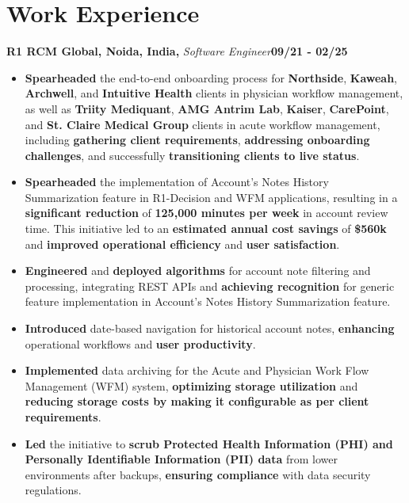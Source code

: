 \documentclass{article}
\newcommand{\subheading}[1]{\textbf{#1}}
\newenvironment{workexp}[3]{%
  \noindent\subheading{#1,} \textit{#2}\hfill\textbf{#3}\par%
}{\bigskip}
\begin{document}
\section*{Work Experience}
\begin{workexp}{R1 RCM Global, Noida, India}{Software Engineer}{09/21 - 02/25}
	\begin{itemize}[left=0pt, align=left]
        \item \textbf{Spearheaded} the end-to-end onboarding process for \textbf{Northside}, \textbf{Kaweah}, \textbf{Archwell}, and \textbf{Intuitive Health} clients in physician workflow management, as well as \textbf{Triity Mediquant}, \textbf{AMG Antrim Lab}, \textbf{Kaiser}, \textbf{CarePoint}, and \textbf{St. Claire Medical Group} clients in acute workflow management, including \textbf{gathering client requirements}, \textbf{addressing onboarding challenges}, and successfully \textbf{transitioning clients to live status}.
            
		\item \textbf{Spearheaded} the implementation of Account’s Notes
		      History Summarization feature in R1-Decision and WFM
		      applications, resulting in a \textbf{significant reduction} of
		      \textbf{125,000 minutes per week} in account review time. This
		      initiative led to an \textbf{estimated annual cost savings} of
		      \textbf{\$560k} and \textbf{improved operational efficiency} and
		      \textbf{user satisfaction}.
		          
		\item \textbf{Engineered} and \textbf{deployed algorithms} for account
		      note filtering and processing, integrating REST APIs and
		      \textbf{achieving recognition} for generic feature
		      implementation in Account’s Notes History Summarization
		      feature.
		          
		\item \textbf{Introduced} date-based navigation for historical
		      account notes, \textbf{enhancing} operational workflows and
		      \textbf{user productivity}.
		          
		\item \textbf{Implemented} data archiving for the Acute and
		      Physician Work Flow Management (WFM) system,
		      \textbf{optimizing storage utilization} and
		      \textbf{reducing storage costs by making it configurable as per
		      client requirements}.
		          
		\item \textbf{Led} the initiative to \textbf{scrub Protected Health Information (PHI) and Personally
		Identifiable Information (PII) data}
		from lower environments after backups,
		\textbf{ensuring compliance} with data security regulations.
		    

\end{itemize}
\end{workexp}
\end{document}
